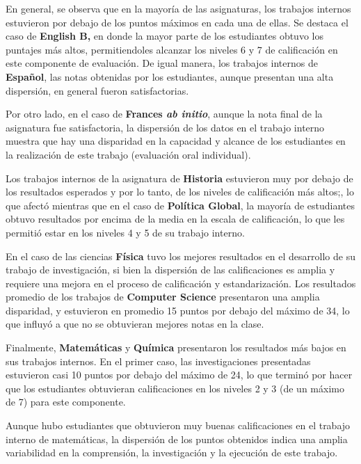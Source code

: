 \documentclass[
  letterpaper,
  DIV=11,
  numbers=noendperiod]{scrartcl}
\begin{document}
En general, se observa que en la mayoría de las asignaturas, los
trabajos internos estuvieron por debajo de los puntos máximos en cada
una de ellas. Se destaca el caso de \textbf{English B,} en donde la
mayor parte de los estudiantes obtuvo los puntajes más altos,
permitiendoles alcanzar los niveles 6 y 7 de calificación en este
componente de evaluación. De igual manera, los trabajos internos de
\textbf{Español}, las notas obtenidas por los estudiantes, aunque
presentan una alta dispersión, en general fueron satisfactorias.

Por otro lado, en el caso de \textbf{Frances \emph{ab initio}}, aunque
la nota final de la asignatura fue satisfactoria, la dispersión de los
datos en el trabajo interno muestra que hay una disparidad en la
capacidad y alcance de los estudiantes en la realización de este trabajo
(evaluación oral individual).

Los trabajos internos de la asignatura de \textbf{Historia} estuvieron
muy por debajo de los resultados esperados y por lo tanto, de los
niveles de calificación más altos;, lo que afectó mientras que en el
caso de \textbf{Política Global}, la mayoría de estudiantes obtuvo
resultados por encima de la media en la escala de calificación, lo que
les permitió estar en los niveles 4 y 5 de su trabajo interno.

En el caso de las ciencias \textbf{Física} tuvo los mejores resultados
en el desarrollo de su trabajo de investigación, si bien la dispersión
de las calificaciones es amplia y requiere una mejora en el proceso de
calificación y estandarización. Los resultados promedio de los trabajos
de \textbf{Computer Science} presentaron una amplia disparidad, y
estuvieron en promedio 15 puntos por debajo del máximo de 34, lo que
influyó a que no se obtuvieran mejores notas en la clase.

Finalmente, \textbf{Matemáticas} y \textbf{Química} presentaron los
resultados más bajos en sus trabajos internos. En el primer caso, las
investigaciones presentadas estuvieron casi 10 puntos por debajo del
máximo de 24, lo que terminó por hacer que los estudiantes obtuvieran
calificaciones en los niveles 2 y 3 (de un máximo de 7) para este
componente.

Aunque hubo estudiantes que obtuvieron muy buenas calificaciones en el
trabajo interno de matemáticas, la dispersión de los puntos obtenidos
indica una amplia variabilidad en la comprensión, la investigación y la
ejecución de este trabajo.
\end{document}
